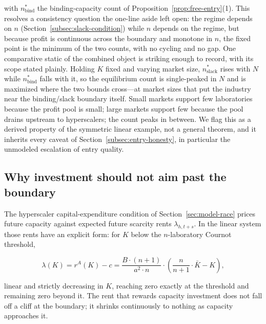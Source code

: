 \documentclass[11pt]{article}
\begin{document}
with $n^{*}_{\mathrm{bind}}$ the binding-capacity count of Proposition~\ref{prop:free-entry}(1). This resolves a consistency question the one-line aside left open: the regime depends on $n$ (Section~\ref{subsec:slack-condition}) while $n$ depends on the regime, but because profit is continuous across the boundary and monotone in $n$, the fixed point is the minimum of the two counts, with no cycling and no gap. One comparative static of the combined object is striking enough to record, with its scope stated plainly. Holding $K$ fixed and varying market size, $n^{*}_{\mathrm{slack}}$ rises with $N$ while $n^{*}_{\mathrm{bind}}$ falls with it, so the equilibrium count is single-peaked in $N$ and is maximized where the two bounds cross---at market sizes that put the industry near the binding/slack boundary itself. Small markets support few laboratories because the profit pool is small; large markets support few because the pool drains upstream to hyperscalers; the count peaks in between. We flag this as a derived property of the symmetric linear example, not a general theorem, and it inherits every caveat of Section~\ref{subsec:entry-honesty}, in particular the unmodeled escalation of entry quality.

\subsection{Why investment should not aim past the boundary}
\label{subsec:slack-investment}

The hyperscaler capital-expenditure condition of Section~\ref{sec:model-race} prices future capacity against expected future scarcity rents $\lambda_{h,t+s}$. In the linear system those rents have an explicit form: for $K$ below the $n$-laboratory Cournot threshold,

\begin{equation}\lambda(K)=r^{A}(K)-c=\frac{B\cdot(n+1)}{a^{2}\cdot n}\cdot\left(\frac{n}{n+1}\cdot\bar K-K\right),\end{equation}

linear and strictly decreasing in $K$, reaching zero exactly at the threshold and remaining zero beyond it. The rent that rewards capacity investment does not fall off a cliff at the boundary; it shrinks continuously to nothing as capacity approaches it.
\end{document}
